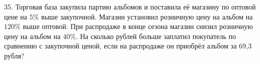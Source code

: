35. Торговая база закупила партию альбомов и поставила её магазину по оптовой цене на $5\%$ выше закупочной. Магазин установил розничную цену на альбом на $120\%$ выше оптовой. При распродаже в конце сезона магазин снизил розничную цену на альбом на $40\%.$ На сколько рублей больше заплатил покупатель по сравнению с закупочной ценой, если на распродаже он приобрёл альбом за 69,3 рубля?\\
